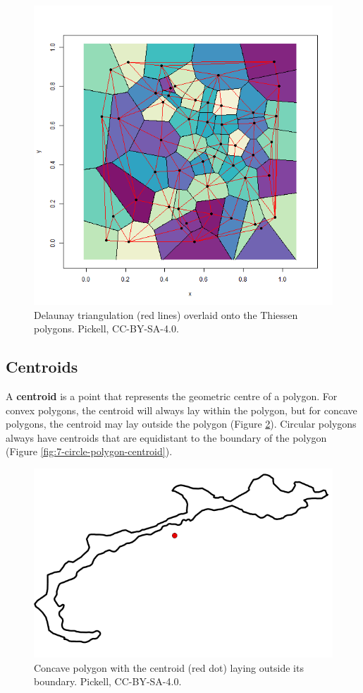 \documentclass[
]{book}
\begin{document}
\begin{figure}
\includegraphics[width=0.75\linewidth]{images/07-delaunay-triangulation-thiessen-polygons} \caption{Delaunay triangulation (red lines) overlaid onto the Thiessen polygons. Pickell, CC-BY-SA-4.0.}\label{fig:7-delaunay-triangulation-thiessen-polygons}
\end{figure}

\hypertarget{centroids}{%
\subsection{Centroids}\label{centroids}}

A \textbf{centroid} is a point that represents the geometric centre of a polygon. For convex polygons, the centroid will always lay within the polygon, but for concave polygons, the centroid may lay outside the polygon (Figure \ref{fig:7-concave-polygon-centroid}). Circular polygons always have centroids that are equidistant to the boundary of the polygon (Figure \ref{fig:7-circle-polygon-centroid}).

\begin{figure}
\includegraphics[width=0.5\linewidth]{images/07-concave-polygon-centroid} \caption{Concave polygon with the centroid (red dot) laying outside its boundary. Pickell, CC-BY-SA-4.0.}\label{fig:7-concave-polygon-centroid}
\end{figure}
\end{document}
